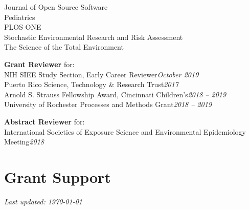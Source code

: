 \documentclass[margin,line]{res}
\newenvironment{list3}{
  \begin{list}{}{%
      \setlength{\itemsep}{0in}
      \setlength{\parsep}{0in} \setlength{\parskip}{0in}
      \setlength{\topsep}{0in} \setlength{\partopsep}{0in}
      \setlength{\leftmargin}{0in}}}{\end{list}}
\begin{document}
\begin{resume}
\begin{list3}
        Journal of Open Source Software \\
        Pediatrics \\
        PLOS ONE \\
        Stochastic Environmental Research and Risk Assessment \\
        The Science of the Total Environment
\item[] \textbf{Grant Reviewer} for: \\
        NIH SIEE Study Section, Early Career Reviewer\hfill \textit{October 2019}\\
        Puerto Rico Science, Technology \& Research Trust\hfill \textit{2017}\\
        Arnold S. Strauss Fellowship Award, Cincinnati Children's\hfill \textit{2018 -- 2019}\\
        University of Rochester Processes and Methods Grant\hfill \textit{2018 -- 2019}
\item[] \textbf{Abstract Reviewer} for: \\
        International Societies of Exposure Science and Environmental Epidemiology Meeting\hfill \textit{2018}
\end{list3}

\section{\sc Grant Support}


\end{resume}

\vfill

\hfill \textit{Last updated: \today}
\end{document}
